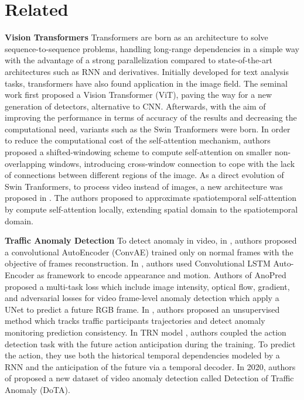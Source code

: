 \section{Related}
\label{sec:related}

\noindent\textbf{Vision Transformers}
Transformers \cite{vaswani2017attention} are born as an architecture to solve sequence-to-sequence problems, handling long-range dependencies in a simple way with the advantage of a strong parallelization compared to state-of-the-art architectures such as RNN and derivatives.
Initially developed for text analysis tasks, transformers have also found application in the image field.
The seminal work \cite{DBLP:conf/iclr/DosovitskiyB0WZ21} first proposed a Vision Transformer (ViT), paving the way for a new generation of detectors, alternative to CNN.
Afterwards, with the aim of improving the performance in terms of accuracy of the results and decreasing the computational need, variants such as the Swin Tranformers \cite{liu2021Swin} were born.
In order to reduce the computational cost of the self-attention mechanism, authors proposed a shifted-windowing scheme to compute self-attention on smaller non-overlapping windows, introducing cross-window connection to cope with the lack of connections between different regions of the image.
As a direct evolution of Swin Tranformers, to process video instead of images, a new architecture was proposed in \cite{liu_video_2022}.
The authors proposed to approximate spatiotemporal self-attention by compute self-attention locally, extending spatial domain to the spatiotemporal domain.

\noindent\textbf{Traffic Anomaly Detection}
To detect anomaly in video, in \cite{hasan2016learning}, authors proposed a convolutional AutoEncoder (ConvAE) trained only on normal frames with the objective of frames reconstruction.
In \cite{luo2017remembering, wang2018abnormal}, authors used Convolutional LSTM Auto-Encoder as framework to encode appearance and motion.
Authors of AnoPred \cite{liu2018future} proposed a multi-task loss which include image intensity, optical flow, gradient, and adversarial losses for video frame-level anomaly detection which apply a UNet to predict a future RGB frame.
In \cite{yao2019unsupervised}, authors proposed an unsupervised method which tracks traffic participants trajectories and detect anomaly monitoring prediction consistency.
In TRN model \cite{xu2019temporal}, authors coupled the action detection task with the future action anticipation during the training.
To predict the action, they use both the historical temporal dependencies modeled by a RNN and the anticipation of the future via a temporal decoder.
In 2020, authors of \cite{9712446} proposed a new dataset of video anomaly detection called Detection of Traffic Anomaly (DoTA).

